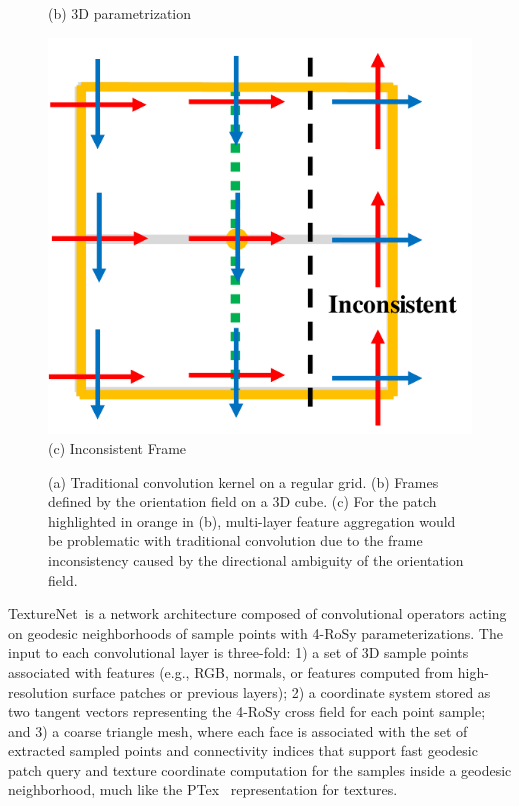 \begin{figure}
\begin{minipage}{0.32\linewidth}
     \footnotesize{
     (b) 3D parametrization
     }
     \end{minipage}
     \begin{minipage}{0.32\linewidth}
     \centering
     \includegraphics[width=\linewidth,height=\linewidth]{texturenet/diagram/conv_coordinate.pdf}\\
     \footnotesize{
     (c) Inconsistent Frame
     }
     \end{minipage}
     \caption{(a) Traditional convolution kernel on a regular grid. (b) Frames defined by the orientation field on a 3D cube. (c) For the patch highlighted in orange in (b), multi-layer feature aggregation would be problematic with traditional convolution due to the frame inconsistency caused by the directional ambiguity of the orientation field.}
     \label{fig:texturenet-singular}
 \end{figure}

TextureNet~is a network architecture composed of convolutional operators acting on geodesic neighborhoods of sample points with 4-RoSy parameterizations.
The input to each convolutional layer is three-fold: 1) a set of 3D sample points associated with features (e.g., RGB, normals, or features computed from high-resolution surface patches or previous layers); 2) a coordinate system stored as two tangent vectors representing the 4-RoSy cross field for each point sample; and 3) a coarse triangle mesh, where each face is associated with the set of extracted sampled points and connectivity indices that support fast geodesic patch query and texture coordinate computation for the samples inside a geodesic neighborhood, much like the PTex~\cite{burley2008ptex} representation for textures. 

